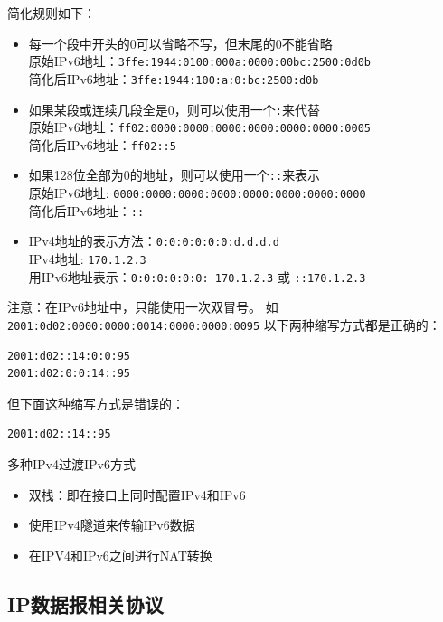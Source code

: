 简化规则如下：
\begin{itemize}
\item 每一个段中开头的0可以省略不写，但末尾的0不能省略\\
原始IPv6地址：\verb'3ffe:1944:0100:000a:0000:00bc:2500:0d0b'\\
简化后IPv6地址：\verb'3ffe:1944:100:a:0:bc:2500:d0b'
\item 如果某段或连续几段全是0，则可以使用一个\verb':'来代替\\
原始IPv6地址：\verb'ff02:0000:0000:0000:0000:0000:0000:0005'\\
简化后IPv6地址：\verb'ff02::5'
\item 如果128位全部为0的地址，则可以使用一个\verb'::'来表示\\
原始IPv6地址: \verb'0000:0000:0000:0000:0000:0000:0000:0000'\\
简化后IPv6地址：\verb'::'
\item IPv4地址的表示方法：\verb'0:0:0:0:0:0:d.d.d.d'\\
IPv4地址: \verb'170.1.2.3'\\
用IPv6地址表示：\verb'0:0:0:0:0:0: 170.1.2.3' 或 \verb'::170.1.2.3'
\end{itemize}
注意：在IPv6地址中，只能使用一次双冒号。
如\verb'2001:0d02:0000:0000:0014:0000:0000:0095'
以下两种缩写方式都是正确的：
\begin{lstlisting}
2001:d02::14:0:0:95
2001:d02:0:0:14::95
\end{lstlisting}
但下面这种缩写方式是错误的：
\begin{lstlisting}
2001:d02::14::95
\end{lstlisting}

多种IPv4过渡IPv6方式
\begin{itemize}
\item 双栈：即在接口上同时配置IPv4和IPv6
\item 使用IPv4隧道来传输IPv6数据
\item 在IPV4和IPv6之间进行NAT转换
\end{itemize}

\subsection{IP数据报相关协议}
